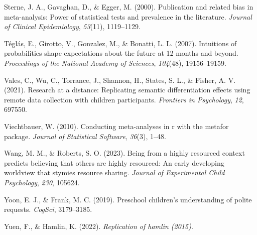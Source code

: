 \documentclass[
  man,floatsintext]{apa6}
\newlength{\cslhangindent}
\newlength{\cslentryspacingunit} %
\newenvironment{CSLReferences}[2] %
 {%
  \setlength{\parindent}{0pt}
  \ifodd #1
  \let\oldpar\par
  \def\par{\hangindent=\cslhangindent\oldpar}
  \fi
  \setlength{\parskip}{#2\cslentryspacingunit}
 }%
 {}
\begin{document}
\begin{CSLReferences}{1}{0}
\leavevmode{}%
Sterne, J. A., Gavaghan, D., \& Egger, M. (2000). Publication and related bias in meta-analysis: Power of statistical tests and prevalence in the literature. \emph{Journal of Clinical Epidemiology}, \emph{53}(11), 1119--1129.

\leavevmode{}%
Téglás, E., Girotto, V., Gonzalez, M., \& Bonatti, L. L. (2007). Intuitions of probabilities shape expectations about the future at 12 months and beyond. \emph{Proceedings of the National Academy of Sciences}, \emph{104}(48), 19156--19159.

\leavevmode{}%
Vales, C., Wu, C., Torrance, J., Shannon, H., States, S. L., \& Fisher, A. V. (2021). Research at a distance: Replicating semantic differentiation effects using remote data collection with children participants. \emph{Frontiers in Psychology}, \emph{12}, 697550.

\leavevmode{}%
Viechtbauer, W. (2010). Conducting meta-analyses in r with the metafor package. \emph{Journal of Statistical Software}, \emph{36}(3), 1--48.

\leavevmode{}%
Wang, M. M., \& Roberts, S. O. (2023). Being from a highly resourced context predicts believing that others are highly resourced: An early developing worldview that stymies resource sharing. \emph{Journal of Experimental Child Psychology}, \emph{230}, 105624.

\leavevmode{}%
Yoon, E. J., \& Frank, M. C. (2019). Preschool children's understanding of polite requests. \emph{CogSci}, 3179--3185.

\leavevmode{}%
Yuen, F., \& Hamlin, K. (2022). \emph{Replication of hamlin (2015)}.

\end{CSLReferences}
\end{document}
